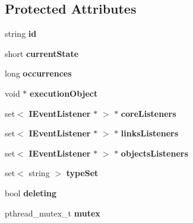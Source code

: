 \subsection*{Protected Attributes}
\begin{CompactItemize}
\item 
string {\bf id}\label{classbr_1_1pucrio_1_1telemidia_1_1ginga_1_1ncl_1_1model_1_1event_1_1FormatterEvent_d97b05b88ce9080f35b157cfacc8eb69}

\item 
short {\bf currentState}\label{classbr_1_1pucrio_1_1telemidia_1_1ginga_1_1ncl_1_1model_1_1event_1_1FormatterEvent_42ff113cf66b333309bc3188b6c3e984}

\item 
long {\bf occurrences}\label{classbr_1_1pucrio_1_1telemidia_1_1ginga_1_1ncl_1_1model_1_1event_1_1FormatterEvent_79eb42d64d47a73e95ce70b984d9cfcb}

\item 
void $\ast$ {\bf executionObject}\label{classbr_1_1pucrio_1_1telemidia_1_1ginga_1_1ncl_1_1model_1_1event_1_1FormatterEvent_5e3b78af1d846baadf8c5441a23d66eb}

\item 
set$<$ {\bf IEventListener} $\ast$ $>$ $\ast$ {\bf coreListeners}\label{classbr_1_1pucrio_1_1telemidia_1_1ginga_1_1ncl_1_1model_1_1event_1_1FormatterEvent_ba5524d8644e67aab7f8dc03cf9acc21}

\item 
set$<$ {\bf IEventListener} $\ast$ $>$ $\ast$ {\bf linksListeners}\label{classbr_1_1pucrio_1_1telemidia_1_1ginga_1_1ncl_1_1model_1_1event_1_1FormatterEvent_d799e99fe899bafb45a51cb3bf778ee4}

\item 
set$<$ {\bf IEventListener} $\ast$ $>$ $\ast$ {\bf objectsListeners}\label{classbr_1_1pucrio_1_1telemidia_1_1ginga_1_1ncl_1_1model_1_1event_1_1FormatterEvent_83ea53d3b07fa821fabcd78f5f881a41}

\item 
set$<$ string $>$ {\bf typeSet}\label{classbr_1_1pucrio_1_1telemidia_1_1ginga_1_1ncl_1_1model_1_1event_1_1FormatterEvent_145b3afaa194308141d367cc1393d565}

\item 
bool {\bf deleting}\label{classbr_1_1pucrio_1_1telemidia_1_1ginga_1_1ncl_1_1model_1_1event_1_1FormatterEvent_73dcd7977c4db81e50a24cbc794320c5}

\item 
pthread\_\-mutex\_\-t {\bf mutex}\label{classbr_1_1pucrio_1_1telemidia_1_1ginga_1_1ncl_1_1model_1_1event_1_1FormatterEvent_4acff8232e4aec9cd5c6dc200ac55ef3}

\end{CompactItemize}
